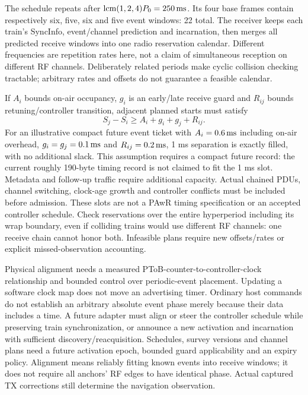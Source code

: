 \documentclass[11pt,letterpaper]{article}
\begin{document}
The schedule repeats after $\operatorname{lcm}(1,2,4)P_0=250\,\mathrm{ms}$. Its four base frames contain respectively six, five, six and five event windows: 22 total. The receiver keeps each train's SyncInfo, event/channel prediction and incarnation, then merges all predicted receive windows into one radio reservation calendar. Different frequencies are repetition rates here, not a claim of simultaneous reception on different RF channels. Deliberately related periods make cyclic collision checking tractable; arbitrary rates and offsets do not guarantee a feasible calendar.

If $A_i$ bounds on-air occupancy, $g_i$ is an early/late receive guard and $R_{ij}$ bounds retuning/controller transition, adjacent planned starts must satisfy
\begin{equation}
 S_j-S_i\geq A_i+g_i+g_j+R_{ij}.\label{eq:guard}
\end{equation}
For an illustrative compact future event ticket with $A_i=0.6\,\mathrm{ms}$ including on-air overhead, $g_i=g_j=0.1\,\mathrm{ms}$ and $R_{ij}=0.2\,\mathrm{ms}$, 1 ms separation is exactly filled, with no additional slack. This assumption requires a compact future record: the current roughly 190-byte timing record is not claimed to fit the 1 ms slot. Metadata and follow-up traffic require additional capacity. Actual chained PDUs, channel switching, clock-age growth and controller conflicts must be included before admission. These slots are not a PAwR timing specification or an accepted controller schedule. Check reservations over the entire hyperperiod including its wrap boundary, even if colliding trains would use different RF channels: one receive chain cannot honor both. Infeasible plans require new offsets/rates or explicit missed-observation accounting.

Physical alignment needs a measured PToB-counter-to-controller-clock relationship and bounded control over periodic-event placement. Updating a software clock map does not move an advertising timer. Ordinary host commands do not establish an arbitrary absolute event phase merely because their data includes a time. A future adapter must align or steer the controller schedule while preserving train synchronization, or announce a new activation and incarnation with sufficient discovery/reacquisition. Schedules, survey versions and channel plans need a future activation epoch, bounded guard applicability and an expiry policy. Alignment means reliably fitting known events into receive windows; it does not require all anchors' RF edges to have identical phase. Actual captured TX corrections still determine the navigation observation.
\end{document}
